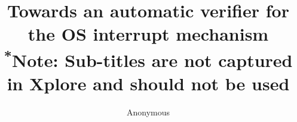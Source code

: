 \documentclass[letterpaper, 10 pt, conference]{IEEEtran}
\begin{document}
\title{Towards an automatic verifier for the OS interrupt mechanism\\
{\footnotesize \textsuperscript{*}Note: Sub-titles are not captured in Xplore and
should not be used}
}
\author{Anonymous}

\maketitle
\end{document}
